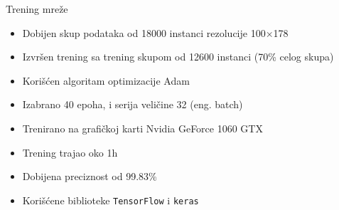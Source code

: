 \documentclass{beamer}
\begin{document}
\begin{frame}{Trening mreže}
    \begin{itemize}
        \item Dobijen skup podataka od 18000 instanci rezolucije 100$\times$178
        \item Izvršen trening sa trening skupom od 12600 instanci (70\%  celog skupa)
        \item Korišćen algoritam optimizacije Adam \cite{adam}
        \item Izabrano 40 epoha, i serija veličine 32 (eng. batch)
        \item Trenirano na grafičkoj karti Nvidia GeForce 1060 GTX
        \item Trening trajao oko 1h
        \item Dobijena preciznost od 99.83\%
        \item Korišćene biblioteke \texttt{TensorFlow} \cite{tensorflow} i \texttt{keras} \cite{keras}
    \end{itemize}
\end{frame}
\end{document}

